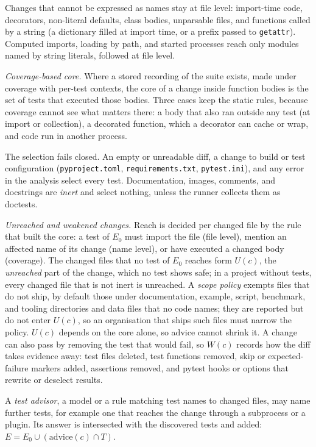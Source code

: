 \documentclass[conference]{IEEEtran}
\begin{document}
Changes that cannot be expressed as names stay at file level: import-time code, decorators, non-literal defaults, class bodies, unparsable files, and functions called by a string (a dictionary filled at import time, or a prefix passed to \texttt{getattr}). Computed imports, loading by path, and started processes reach only modules named by string literals, followed at file level.

\emph{Coverage-based core.} Where a stored recording of the suite exists, made under coverage with per-test contexts, the core of a change inside function bodies is the set of tests that executed those bodies. Three cases keep the static rules, because coverage cannot see what matters there: a body that also ran outside any test (at import or collection), a decorated function, which a decorator can cache or wrap, and code run in another process.

The selection fails closed. An empty or unreadable diff, a change to build or test configuration (\texttt{pyproject.toml}, \texttt{requirements.txt}, \texttt{pytest.ini}), and any error in the analysis select every test. Documentation, images, comments, and docstrings are \emph{inert} and select nothing, unless the runner collects them as doctests.

\emph{Unreached and weakened changes.} Reach is decided per changed file by the rule that built the core: a test of \(E_0\) must import the file (file level), mention an affected name of its change (name level), or have executed a changed body (coverage). The changed files that no test of \(E_0\) reaches form \(U(c)\), the \emph{unreached} part of the change, which no test shows safe; in a project without tests, every changed file that is not inert is unreached. A \emph{scope policy} exempts files that do not ship, by default those under documentation, example, script, benchmark, and tooling directories and data files that no code names; they are reported but do not enter \(U(c)\), so an organisation that ships such files must narrow the policy. \(U(c)\) depends on the core alone, so advice cannot shrink it. A change can also pass by removing the test that would fail, so \(W(c)\) records how the diff takes evidence away: test files deleted, test functions removed, skip or expected-failure markers added, assertions removed, and pytest hooks or options that rewrite or deselect results.

A \emph{test advisor}, a model or a rule matching test names to changed files, may name further tests, for example one that reaches the change through a subprocess or a plugin. Its answer is intersected with the discovered tests and added: \(E = E_0 \cup (\mathrm{advice}(c) \cap T)\).
\end{document}
